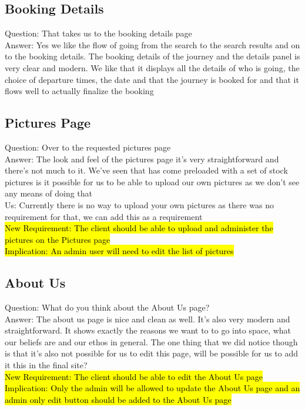 \documentclass{article}
\begin{document}
\subsection{Booking Details}
Question: That takes us to the booking details page
\\
Answer: Yes we like the flow of going from the search to the search results and on to the booking details. The booking details of the journey and the details panel is very clear and modern. We like that it displays all the details of who is going, the choice of departure times, the date and that the journey is booked for and that it flows well to actually finalize the booking
\\
\subsection{Pictures Page}
Question: Over to the requested pictures page
\\
Answer: The look and feel of the pictures page it's very straightforward and there's not much to it. We've seen that has come preloaded with a set of stock pictures is it possible for us to be able to upload our own pictures as we don't see any means of doing that
\\
Us: Currently there is no way to upload your own pictures as there was no requirement for that, we can add this as a requirement
\\
\hl{New Requirement: The client should be able to upload and administer the pictures on the Pictures page
\\
Implication: An admin user will need to edit the list of pictures}
\\
\subsection{About Us}
Question: What do you think about the About Us page?
\\
Answer: The about us page is nice and clean as well. It's also very modern and straightforward. It shows exactly the reasons we want to to go into space, what our beliefs are and our ethos in general. The one thing that we did notice though is that it's also not possible for us to edit this page, will be possible for us to add it this in the final site?
\\
\hl{New Requirement: The client should be able to edit the About Us page
\\
Implication: Only the admin will be allowed to update the About Us page and an admin only edit button should be added to the About Us page}
\\
\end{document}
